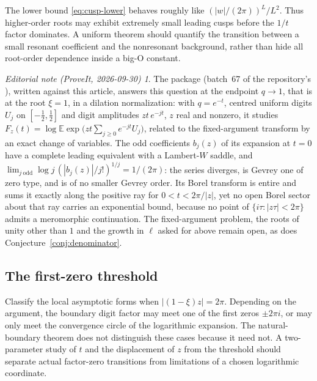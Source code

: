\documentclass[11pt,a4paper]{article}
\numberwithin{equation}{section}
\theoremstyle{definition}
\theoremstyle{remark}
\newtheorem*{ednote}{Editorial note (ProveIt, 2026-09-30)}
\begin{document}
The lower bound \eqref{eq:cusp-lower} behaves roughly like \((|w|/(2\pi))^L/L^2\). Thus higher-order roots may exhibit extremely small leading cusps before the \(1/t\) factor dominates. A uniform theorem should quantify the transition between a small resonant coefficient and the nonresonant background, rather than hide all root-order dependence inside a big-O constant.
\begin{ednote}
The package 
(batch~67 of the repository's ), written against this
article, answers this question at the endpoint $q\to1$, that is at the root
$\xi=1$, in a dilation normalization: with $q=e^{-t}$, centred uniform
digits $U_j$ on $[-\tfrac12,\tfrac12]$ and digit amplitudes $zt\,e^{-jt}$,
$z$ real and nonzero, it studies
$F_z(t)=\log\mathbb E\exp\bigl(zt\sum_{j\ge0}e^{-jt}U_j\bigr)$, related to
the fixed-argument transform by an exact change of variables. The odd
coefficients $b_j(z)$ of its expansion at $t=0$ have a complete leading
equivalent with a Lambert-$W$ saddle, and
$\lim_{j\ \mathrm{odd}}\log j\,(|b_j(z)|/j!)^{1/j}=1/(2\pi)$: the series
diverges, is Gevrey one of zero type, and is of no smaller Gevrey order.
Its Borel transform is entire and sums it exactly along the positive ray
for $0<t<2\pi/|z|$, yet no open Borel sector about that ray carries an
exponential bound, because no point of $\{i\tau:|z\tau|<2\pi\}$ admits a
meromorphic continuation. The fixed-argument problem, the roots of unity
other than $1$ and the growth in $\ell$ asked for above remain open, as
does Conjecture~\ref{conj:denominator}.
\end{ednote}

\subsection{The first-zero threshold}
Classify the local asymptotic forms when \(|(1-\xi)z|=2\pi\). Depending on the argument, the boundary digit factor may meet one of the first zeros \(\pm2\pi i\), or may only meet the convergence circle of the logarithmic expansion. The natural-boundary theorem does not distinguish these cases because it need not. A two-parameter study of \(t\) and the displacement of \(z\) from the threshold should separate actual factor-zero transitions from limitations of a chosen logarithmic coordinate.
\end{document}
